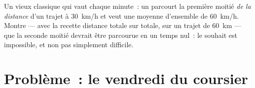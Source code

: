 \begin{exercise}[$\star\star\star$]\label{exo:g7:motion-average-speed:12}
Un vieux classique qui vaut chaque minute~: un  parcourt la
première moitié \emph{de la distance} d'un trajet à \qty{30}{km/h} et
veut une moyenne d'ensemble de \qty{60}{km/h}. Montre --- avec la
recette distance totale sur  totale, sur un trajet de
\qty{60}{km} --- que la seconde moitié devrait être parcourue en un
temps nul~: le souhait est impossible, et non pas simplement
difficile.
\end{exercise}

\section{Problème~: le vendredi du coursier}

